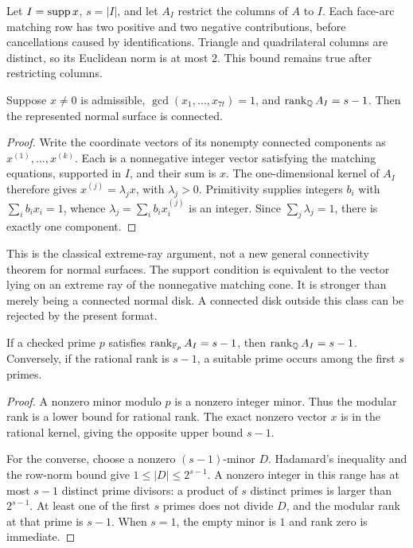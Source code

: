 Let $I=\operatorname{supp} x$, $s=|I|$, and let $A_I$ restrict the columns of $A$ to $I$.
Each face-arc matching row has two positive and two negative contributions,
before cancellations caused by identifications. Triangle and quadrilateral
columns are distinct, so its Euclidean norm is at most $2$. This bound
remains true after restricting columns.

\begin{theorem}
\label{thm:primitive}
Suppose $x\ne0$ is admissible, $\gcd(x_1,\ldots,x_{7t})=1$, and
$\operatorname{rank}_\mathbb Q A_I=s-1$. Then the represented normal surface is connected.
\end{theorem}
\begin{proof}
Write the coordinate vectors of its nonempty connected components as
$x^{(1)},\ldots,x^{(k)}$. Each is a nonnegative integer vector satisfying
the matching equations, supported in $I$, and their sum is $x$.
The one-dimensional kernel of $A_I$ therefore gives
$x^{(j)}=\lambda_jx$, with $\lambda_j>0$.
Primitivity supplies integers $b_i$ with $\sum_i b_i x_i=1$, whence
$\lambda_j=\sum_i b_i x_i^{(j)}$ is an integer. Since
$\sum_j\lambda_j=1$, there is exactly one component.
\end{proof}

This is the classical extreme-ray argument, not a new general connectivity
theorem for normal surfaces. The support condition is equivalent to the
vector lying on an extreme ray of the nonnegative matching cone. It is
stronger than merely being a connected normal disk. A connected disk outside
this class can be rejected by the present format.

\begin{lemma}
\label{lem:rank-prime}
If a checked prime $p$ satisfies $\operatorname{rank}_{\mathbb F_p} A_I=s-1$, then
$\operatorname{rank}_\mathbb Q A_I=s-1$. Conversely, if the rational rank is $s-1$, a suitable
prime occurs among the first $s$ primes.
\end{lemma}
\begin{proof}
A nonzero minor modulo $p$ is a nonzero integer minor. Thus the modular rank
is a lower bound for rational rank. The exact nonzero vector $x$ is in the
rational kernel, giving the opposite upper bound $s-1$.

For the converse, choose a nonzero $(s-1)$-minor $D$. Hadamard's inequality
and the row-norm bound give $1\leq|D|\leq2^{s-1}$. A nonzero integer in
this range has at most $s-1$ distinct prime divisors: a product of $s$
distinct primes is larger than $2^{s-1}$. At least one of the first $s$
primes does not divide $D$, and the modular rank at that prime is $s-1$.
When $s=1$, the empty minor is $1$ and rank zero is immediate.
\end{proof}

